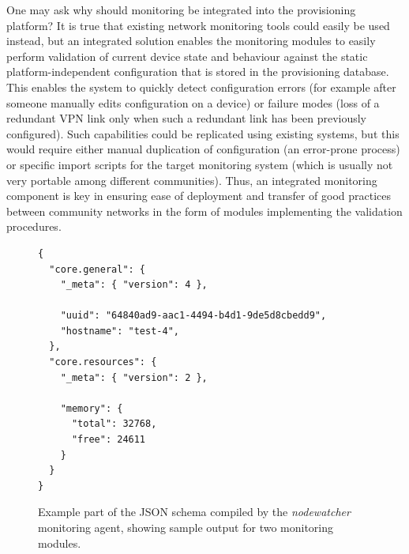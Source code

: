 \documentclass[5p,sort&compress]{elsarticle}
\newcommand{\nodewatcher}{\textit{nodewatcher}}
\begin{document}
One may ask why should monitoring be integrated into the provisioning platform?
It is true that existing network monitoring tools could easily be used instead, but an integrated solution enables the monitoring modules to easily perform validation of current device state and behaviour against the static platform-independent configuration that is stored in the provisioning database.
This enables the system to quickly detect configuration errors (for example after someone manually edits configuration on a device) or failure modes (loss of a redundant VPN link only when such a redundant link has been previously configured).
Such capabilities could be replicated using existing systems, but this would require either manual duplication of configuration (an error-prone process) or specific import scripts for the target monitoring system (which is usually not very portable among different communities).
Thus, an integrated monitoring component is key in ensuring ease of deployment and transfer of good practices between community networks in the form of modules implementing the validation procedures.

\begin{figure}[t]
\centering
\begin{verbatim}
{
  "core.general": {
    "_meta": { "version": 4 },
    
    "uuid": "64840ad9-aac1-4494-b4d1-9de5d8cbedd9",
    "hostname": "test-4",
  },
  "core.resources": {
    "_meta": { "version": 2 },
    
    "memory": {
      "total": 32768,
      "free": 24611
    }
  }
}
\end{verbatim}
\caption{Example part of the JSON schema compiled by the \nodewatcher{} monitoring agent, showing sample output for two monitoring modules.}
\label{fig:monitoring-json-schema}
\end{figure}
\end{document}
